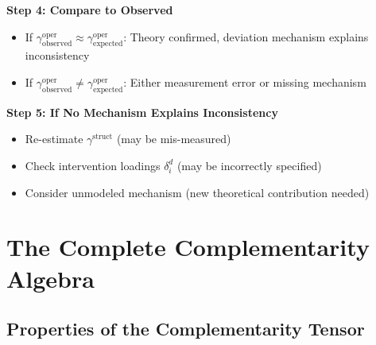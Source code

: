 \begin{tcolorbox}[colback=yellow!5!white, colframe=yellow!75!black,
    title=Diagnostic Protocol: When $\gamma$ Values Seem Inconsistent]
\textbf{Step 4: Compare to Observed}
\begin{itemize}[nosep]
    \item If $\gamma^{\text{oper}}_{\text{observed}} \approx \gamma^{\text{oper}}_{\text{expected}}$: Theory confirmed, deviation mechanism explains inconsistency
    \item If $\gamma^{\text{oper}}_{\text{observed}} \neq \gamma^{\text{oper}}_{\text{expected}}$: Either measurement error or missing mechanism
\end{itemize}

\textbf{Step 5: If No Mechanism Explains Inconsistency}
\begin{itemize}[nosep]
    \item Re-estimate $\gamma^{\text{struct}}$ (may be mis-measured)
    \item Check intervention loadings $\delta_i^d$ (may be incorrectly specified)
    \item Consider unmodeled mechanism (new theoretical contribution needed)
\end{itemize}

\end{tcolorbox}

\section{The Complete Complementarity Algebra}
\label{sec:gtc-algebra}

\subsection{Properties of the Complementarity Tensor}

